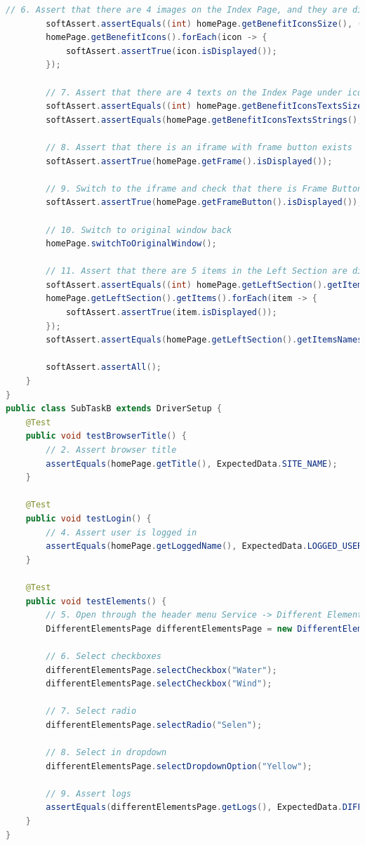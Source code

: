 \documentclass[a4paper]{article}
\begin{document}
\begin{lstlisting}[language=Java]
        // 6. Assert that there are 4 images on the Index Page, and they are displayed
        softAssert.assertEquals((int) homePage.getBenefitIconsSize(), (int) ExpectedData.BENEFIT_ICONS.size());
        homePage.getBenefitIcons().forEach(icon -> {
            softAssert.assertTrue(icon.isDisplayed());
        });

        // 7. Assert that there are 4 texts on the Index Page under icons, and they have proper text
        softAssert.assertEquals((int) homePage.getBenefitIconsTextsSize(), (int) ExpectedData.BENEFIT_ICONS.size());
        softAssert.assertEquals(homePage.getBenefitIconsTextsStrings(), ExpectedData.BENEFIT_ICONS);

        // 8. Assert that there is an iframe with frame button exists
        softAssert.assertTrue(homePage.getFrame().isDisplayed());

        // 9. Switch to the iframe and check that there is Frame Button in the iframe
        softAssert.assertTrue(homePage.getFrameButton().isDisplayed());

        // 10. Switch to original window back
        homePage.switchToOriginalWindow();

        // 11. Assert that there are 5 items in the Left Section are displayed, and they have proper text
        softAssert.assertEquals((int) homePage.getLeftSection().getItemSize(), (int) ExpectedData.LEFT_SECTION_ITEMS.size());
        homePage.getLeftSection().getItems().forEach(item -> {
            softAssert.assertTrue(item.isDisplayed());
        });
        softAssert.assertEquals(homePage.getLeftSection().getItemsNames(), ExpectedData.LEFT_SECTION_ITEMS);

        softAssert.assertAll();
    }
}
public class SubTaskB extends DriverSetup {
    @Test
    public void testBrowserTitle() {
        // 2. Assert browser title
        assertEquals(homePage.getTitle(), ExpectedData.SITE_NAME);
    }

    @Test
    public void testLogin() {
        // 4. Assert user is logged in
        assertEquals(homePage.getLoggedName(), ExpectedData.LOGGED_USER_NAME);
    }

    @Test
    public void testElements() {
        // 5. Open through the header menu Service -> Different Elements Page
        DifferentElementsPage differentElementsPage = new DifferentElementsPage(webDriver, homePage);

        // 6. Select checkboxes
        differentElementsPage.selectCheckbox("Water");
        differentElementsPage.selectCheckbox("Wind");

        // 7. Select radio
        differentElementsPage.selectRadio("Selen");

        // 8. Select in dropdown
        differentElementsPage.selectDropdownOption("Yellow");

        // 9. Assert logs
        assertEquals(differentElementsPage.getLogs(), ExpectedData.DIFFERENT_ELEMENTS_LOGS);
    }
}\end{lstlisting}
\end{document}

